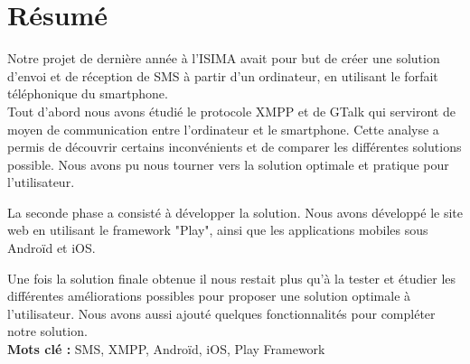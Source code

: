 \cleardoublepage



\chapter*{Résumé}

\thispagestyle{empty}



Notre projet de dernière année à l'ISIMA avait pour but de créer une solution d'envoi et de réception de SMS à partir d'un ordinateur, en utilisant le forfait téléphonique du smartphone.
\\


Tout d'abord nous avons étudié le protocole XMPP et de GTalk qui serviront de moyen de communication entre l'ordinateur et le smartphone.
Cette analyse a permis de découvrir certains inconvénients et de comparer les différentes solutions possible.
Nous avons pu nous tourner vers la solution optimale et pratique pour l'utilisateur.

La seconde phase a consisté à développer la solution.
Nous avons développé le site web en utilisant le framework "Play", ainsi que les applications mobiles sous Androïd et iOS.

Une fois la solution finale obtenue il nous restait plus qu'à la tester et étudier les différentes améliorations possibles pour proposer une solution optimale à l'utilisateur.
Nous avons aussi ajouté quelques fonctionnalités pour compléter notre solution.
\\



\textbf{Mots clé : }
SMS, XMPP, Androïd, iOS, Play Framework